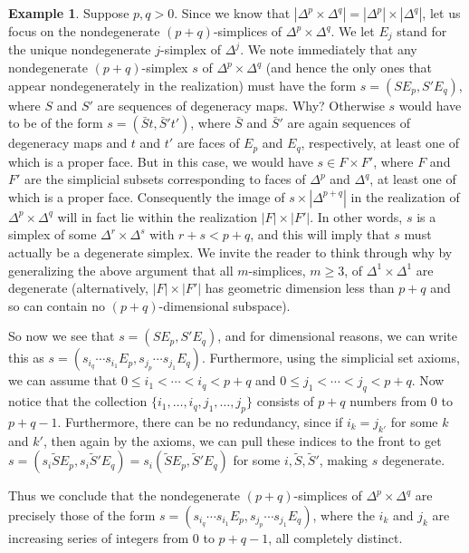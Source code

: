 \documentclass[12pt]{article}
\theoremstyle{plain}
\theoremstyle{definition}
\newtheorem{example}[theorem]{Example}
\newcommand{\td}[1]{\tilde{#1}}
\begin{document}
\begin{example}\label{E: prism}
Suppose $p,q>0$. 
Since we know that $|\Delta^p\times \Delta^q|=|\Delta^p|\times |\Delta^q|$, let us focus on the nondegenerate $(p+q)$-simplices  of $\Delta^p\times \Delta^q$. We let $E_j$ stand for the unique nondegenerate $j$-simplex of $\Delta^j$. We note immediately that any nondegenerate $(p+q)$-simplex $s$ of $\Delta^p\times \Delta^q$ (and hence the only ones that appear nondegenerately in the realization) must have the form $s=(SE_p, S'E_q)$, where $S$ and $S'$ are sequences of degeneracy maps. Why? Otherwise $s$ would have to be of the form  $s=(\bar St, \bar S't')$, where $\bar S$ and $\bar S'$ are again sequences of degeneracy maps and $t$ and $t'$ are faces of $E_p$ and $E_q$, respectively, at least one of which is a proper face. But in this case, we would have $s\in F\times F'$, where $F$ and $F'$ are the simplicial subsets corresponding to faces of $\Delta^p$ and $\Delta^q$, at least one of which is a proper face. Consequently the image of $s\times |\Delta^{p+q}|$ in the realization of $\Delta^p\times \Delta^q$ will in fact lie within the realization $|F|\times |F'|$. In other words, $s$ is a simplex of some $\Delta^r\times \Delta^s$ with $r+s<p+q$, and this will imply that $s$ must actually be a degenerate simplex.  We invite the reader to think through why by generalizing the above argument that all $m$-simplices, $m\geq 3$, of $\Delta^1\times \Delta^1$ are degenerate (alternatively, $|F|\times |F'|$ has geometric dimension less than $p+q$ and so can contain no $(p+q)$-dimensional subspace).

So now we see that  $s=(SE_p, S'E_q)$, and for dimensional reasons, we can write this as $s=(s_{i_q}\cdots s_{i_{1}}E_p, s_{j_p}\cdots s_{j_{1}}E_q)$. Furthermore, using the simplicial set axioms, we can assume that $0\leq i_1< \cdots < i_q< p+q$ and $0\leq j_1< \cdots <j_q< p+q$. Now notice that the collection $\{i_1,\ldots, i_q,j_1,\ldots, j_p\}$ consists of $p+q$ numbers from $0$ to $p+q-1$. Furthermore, there can be no redundancy, since if $i_k=j_{k'}$ for some $k$ and $k'$, then again by the axioms, we can pull these indices to the front to get $s=(s_{i}\td S E_p,s_{i}\td S'E_q)=s_{i}(\td S E_p,\td S'E_q)$ for some $i, \td S,\td S'$, making $s$ degenerate. 

Thus we conclude that the nondegenerate $(p+q)$-simplices of $\Delta^p\times \Delta^q$ are precisely those of the form $s=(s_{i_q}\cdots s_{i_{1}}E_p, s_{j_p}\cdots s_{j_{1}}E_q)$, where the $i_k$ and $j_k$ are increasing series of integers from $0$ to $p+q-1$, all completely distinct.


\end{example}
\end{document}
